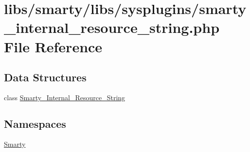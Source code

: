 \hypertarget{smarty__internal__resource__string_8php}{}\section{libs/smarty/libs/sysplugins/smarty\+\_\+internal\+\_\+resource\+\_\+string.php File Reference}
\label{smarty__internal__resource__string_8php}
\subsection*{Data Structures}
\begin{DoxyCompactItemize}
\item 
class \hyperlink{class_smarty___internal___resource___string}{Smarty\+\_\+\+Internal\+\_\+\+Resource\+\_\+\+String}
\end{DoxyCompactItemize}
\subsection*{Namespaces}
\begin{DoxyCompactItemize}
\item 
 \hyperlink{namespace_smarty}{Smarty}
\end{DoxyCompactItemize}
